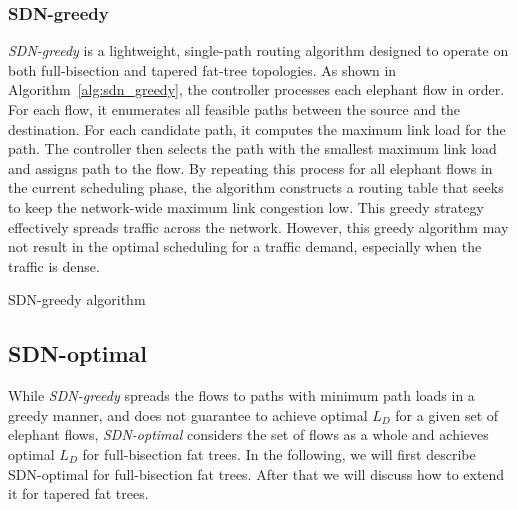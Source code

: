 \subsubsection{SDN-greedy}

\textit{SDN-greedy} is a lightweight, single-path routing algorithm
designed to operate on both full-bisection and tapered fat-tree
topologies. As shown in Algorithm~\ref{alg:sdn_greedy}, the controller
processes each elephant flow in order. For each flow, it enumerates
all feasible paths between the source and the destination. For each
candidate path, it computes the maximum link load for the path.
The controller then selects the path with the smallest maximum link load
and assigns path to the flow.
By repeating this process for all elephant flows in the current
scheduling phase, the algorithm constructs a routing table that seeks
to keep the network-wide maximum link congestion low. This greedy
strategy effectively spreads traffic across the network. However, this
greedy algorithm may not result in the optimal scheduling for a
traffic demand, especially when the traffic is dense. 

\begin{algorithm}[H]
\DontPrintSemicolon
\caption{SDN-greedy algorithm}
\label{alg:sdn_greedy}
\end{algorithm}

\subsection{SDN-optimal}

While \textit{SDN-greedy} spreads the flows to paths with minimum path
loads in a greedy manner, and does not guarantee to achieve optimal $L_D$ for
a given set of elephant flows, \textit{SDN-optimal} considers the set of flows
as a whole and achieves optimal $L_D$ for full-bisection fat trees.
In the following, we will first describe SDN-optimal for full-bisection fat
trees. After that we will discuss how to extend it for tapered fat trees. 

